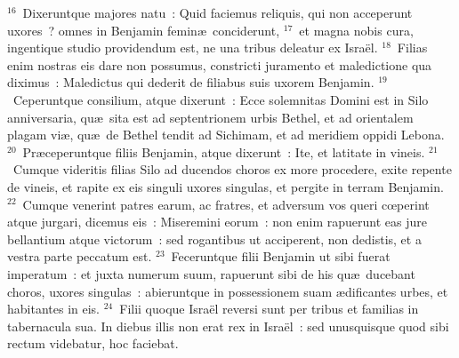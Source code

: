 ${}^{16}$~Dixeruntque majores natu~: Quid faciemus reliquis, qui non acceperunt uxores~? omnes in Benjamin femin\ae\ conciderunt,
${}^{17}$~et magna nobis cura, ingentique studio providendum est, ne una tribus deleatur ex Isra\"el.
${}^{18}$~Filias enim nostras eis dare non possumus, constricti juramento et maledictione qua diximus~: Maledictus qui dederit de filiabus suis uxorem Benjamin.
${}^{19}$~Ceperuntque consilium, atque dixerunt~: Ecce solemnitas Domini est in Silo anniversaria, qu\ae\ sita est ad septentrionem urbis Bethel, et ad orientalem plagam vi\ae , qu\ae\ de Bethel tendit ad Sichimam, et ad meridiem oppidi Lebona.
${}^{20}$~Pr\ae ceperuntque filiis Benjamin, atque dixerunt~: Ite, et latitate in vineis.
${}^{21}$~Cumque videritis filias Silo ad ducendos choros ex more procedere, exite repente de vineis, et rapite ex eis singuli uxores singulas, et pergite in terram Benjamin.
${}^{22}$~Cumque venerint patres earum, ac fratres, et adversum vos queri cœperint atque jurgari, dicemus eis~: Miseremini eorum~: non enim rapuerunt eas jure bellantium atque victorum~: sed rogantibus ut acciperent, non dedistis, et a vestra parte peccatum est.
${}^{23}$~Feceruntque filii Benjamin ut sibi fuerat imperatum~: et juxta numerum suum, rapuerunt sibi de his qu\ae\ ducebant choros, uxores singulas~: abieruntque in possessionem suam \ae dificantes urbes, et habitantes in eis.
${}^{24}$~Filii quoque Isra\"el reversi sunt per tribus et familias in tabernacula sua. In diebus illis non erat rex in Isra\"el~: sed unusquisque quod sibi rectum videbatur, hoc faciebat.
